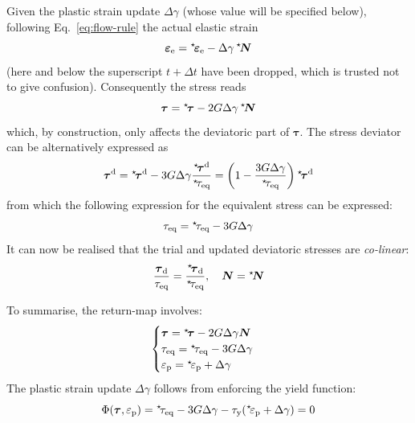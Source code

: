 \documentclass[garamond]{goose-article}
\newcommand\ST[1]{\hspace*{-.3em}~^\star\!#1}
\newcommand\T[1]{\bm{{#1}}}
\begin{document}
Given the plastic strain update $\Delta \gamma$ (whose value will be specified below), following Eq.~\eqref{eq:flow-rule} the actual elastic strain
\begin{equation}
  \T{\varepsilon}_\mathrm{e} = \ST{\T{\varepsilon}}_\mathrm{e} - \Delta \gamma \,\ST{\T{N}}
\end{equation}
(here and below the superscript $t + \Delta t$ have been dropped, which is trusted not to give confusion). Consequently the stress reads
\begin{equation}
  \T{\tau} = \ST{\T{\tau}} - 2 G \Delta \gamma \, \ST{\T{N}}
\end{equation}
which, by construction, only affects the deviatoric part of $\T{\tau}$. The stress deviator can be alternatively expressed as
\begin{equation}
  \T{\tau}^\mathrm{d} = \ST{\T{\tau}}^\mathrm{d} - 3 G \Delta \gamma \frac{\ST{\T{\tau}}^\mathrm{d}}{\ST{\tau}_\mathrm{eq}} = \left( 1 - \frac{3 G \Delta \gamma }{\ST{\tau}_\mathrm{eq}} \right) \ST{\T{\tau}}^\mathrm{d}
\end{equation}
from which the following expression for the equivalent stress can be expressed:
\begin{equation}
  \tau_\mathrm{eq} = \ST{\tau}_\mathrm{eq} - 3 G \Delta \gamma
\end{equation}
It can now be realised that the trial and updated deviatoric stresses are \emph{co-linear}:
\begin{equation}
  \frac{ \T{\tau}_\mathrm{d} }{ \tau_\mathrm{eq} }
  =
  \frac{ \ST{\T{\tau}}_\mathrm{d} }{ \ST{\tau}_\mathrm{eq} }, \quad
  \T{N} = \ST{\T{N}}
\end{equation}

To summarise, the return-map involves:
\begin{equation}
  \begin{cases}
    \T{\tau} = \ST{\T{\tau}} - 2 G \Delta \gamma \T{N}
    \\
    \tau_\mathrm{eq} = \ST{\tau}_\mathrm{eq} - 3 G \Delta \gamma
    \\
    \varepsilon_\mathrm{p} = \ST{\varepsilon}_\mathrm{p} + \Delta \gamma
  \end{cases}
\end{equation}
The plastic strain update $\Delta \gamma$ follows from enforcing the yield function:
\begin{equation}
  \Phi(\T{\tau}, \varepsilon_\mathrm{p}) = \ST{\tau}_\mathrm{eq} - 3 G \Delta \gamma - \tau_\mathrm{y} ( \ST{\varepsilon}_\mathrm{p} + \Delta \gamma ) = 0
  \label{eq:return-map:yield-function}
\end{equation}
\end{document}
